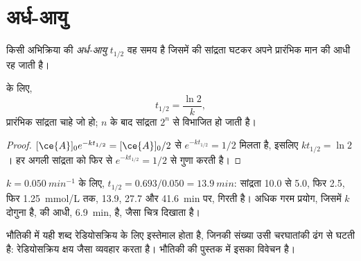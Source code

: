\section{अर्ध-आयु}

\begin{definition}[अर्ध-आयु]\label{def:g12:reaction-rates:half-life}
किसी अभिक्रिया की \emph{अर्ध-आयु} $t_{1/2}$ वह समय है
जिसमें  की सांद्रता घटकर अपने प्रारंभिक मान की
आधी रह जाती है।
\end{definition}

\begin{proposition}[प्रथम कोटि की अभिक्रिया की अर्ध-आयु]\label{prop:g12:reaction-rates:half-life}
 के लिए,
\[
  t_{1/2} = \frac{\ln 2}{k},
\]
प्रारंभिक सांद्रता चाहे जो हो; $n$  के बाद
सांद्रता $2^n$ से विभाजित हो जाती है।
\end{proposition}

\begin{proof}
$[\ce{A}]_0 e^{-k t_{1/2}} = [\ce{A}]_0 / 2$ से $e^{-k t_{1/2}} = 1/2$ मिलता है,
इसलिए $k t_{1/2} = \ln 2$। हर अगली 
सांद्रता को फिर से $e^{-k t_{1/2}} = 1/2$ से गुणा करती है।
\end{proof}


\begin{example}[अर्ध-आयु पढ़ना]\label{ex:g12:reaction-rates:half-lives}
$k = \qty{0.050}{min^{-1}}$ के लिए, $t_{1/2} = 0.693 / 0.050 =
\qty{13.9}{min}$: सांद्रता 10.0 से 5.0, फिर 2.5,
फिर \qty{1.25}{mmol/L} तक, 13.9, 27.7 और \qty{41.6}{min} पर, गिरती है। अधिक गरम प्रयोग,
जिसमें $k$ दोगुना है, की  आधी, \qty{6.9}{min}, है, जैसा
चित्र दिखाता है।
\end{example}

\begin{remark}[दूसरी जगहों पर अर्ध-आयु]\label{rem:g12:reaction-rates:radioactive}
भौतिकी में यही शब्द रेडियोसक्रिय  के लिए इस्तेमाल होता है, जिनकी संख्या
उसी चरघातांकी ढंग से घटती है: रेडियोसक्रिय क्षय
 जैसा व्यवहार करता है। भौतिकी की पुस्तक में इसका विवेचन है।
\end{remark}

